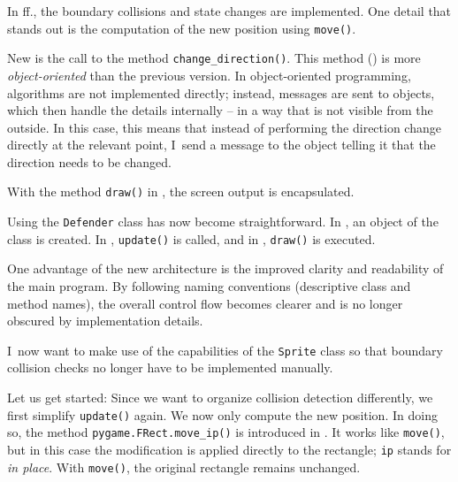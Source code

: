 In ff., the boundary collisions and state changes are implemented. One detail that stands out is the computation of the new position using \texttt{move()}.

New is the call to the method \texttt{change\_direction()}. This method () is more \emph{object-oriented} than the previous version. In object-oriented programming, algorithms are not implemented directly; instead, messages are sent to objects, which then handle the details internally -- in a way that is not visible from the outside. In this case, this means that instead of performing the direction change directly at the relevant point, I~send a message to the object telling it that the direction needs to be changed.

With the method \texttt{draw()} in , the screen output is encapsulated.



Using the \texttt{Defender} class has now become straightforward. In , an object of the class is created. In , \texttt{update()} is called, and in , \texttt{draw()} is executed.

One advantage of the new architecture is the improved clarity and readability of the main program. By following naming conventions (descriptive class and method names), the overall control flow becomes clearer and is no longer obscured by implementation details.

I~now want to make use of the capabilities of the \texttt{Sprite} class so that boundary collision checks no longer have to be implemented manually.

Let us get started: Since we want to organize collision detection differently, we first simplify \texttt{update()} again. We now only compute the new position. In doing so, the method \texttt{pygame.FRect.move\_ip()} is introduced in . It works like \texttt{move()}, but in this case the modification is applied directly to the rectangle; \texttt{ip} stands for \emph{in place}. With \texttt{move()}, the original rectangle remains unchanged.


